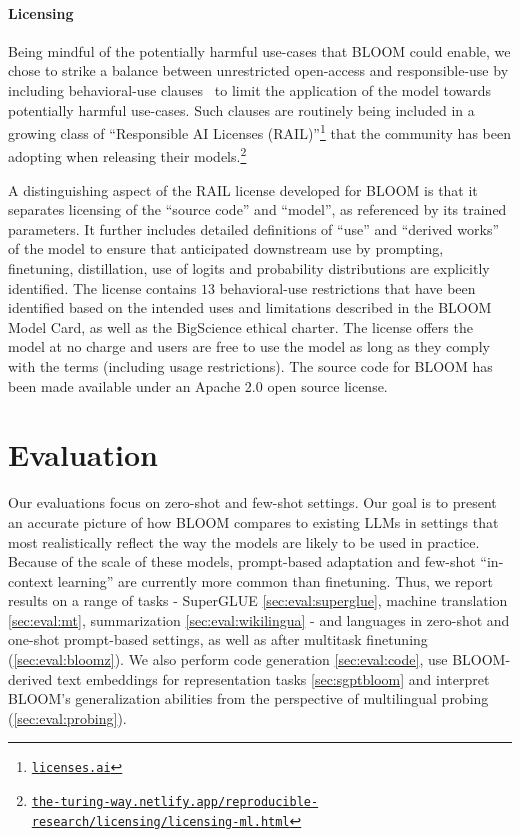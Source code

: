 \paragraph{Licensing}
Being mindful of the potentially harmful use-cases that BLOOM could enable, we chose to strike a balance between unrestricted open-access and responsible-use by including behavioral-use clauses~\citep{LicensingPaper} to limit the application of the model towards potentially harmful use-cases. Such clauses are routinely being included in a growing class of ``Responsible AI Licenses (RAIL)''\footnote{\href{http://licenses.ai}{\texttt{licenses.ai}}} that the community has been adopting when releasing their models.\footnote{\href{https://the-turing-way.netlify.app/reproducible-research/licensing/licensing-ml.html}{\texttt{the-turing-way.netlify.app/reproducible-research/licensing/licensing-ml.html}}} 

A distinguishing aspect of the RAIL license developed for BLOOM is that it separates licensing of the ``source code'' and ``model'', as referenced by its trained parameters. It further includes detailed definitions of ``use'' and ``derived works'' of the model to ensure that anticipated downstream use by prompting, finetuning, distillation, use of logits and probability distributions are explicitly identified. The license contains $13$ behavioral-use restrictions that have been identified based on the intended uses and limitations described in the BLOOM Model Card, as well as the BigScience ethical charter. The license offers the model at no charge and users are free to use the model as long as they comply with the terms (including usage restrictions). The source code for BLOOM has been made available under an Apache 2.0 open source license.

\section{Evaluation}
\label{sec:evaluation}

Our evaluations focus on zero-shot and few-shot settings. Our goal is to present an accurate picture of how BLOOM compares to existing LLMs in settings that most realistically reflect the way the models are likely to be used in practice. Because of the scale of these models, prompt-based adaptation and few-shot ``in-context learning'' are currently more common than finetuning. Thus, we report results on a range of tasks - SuperGLUE \ref{sec:eval:superglue}, machine translation \ref{sec:eval:mt}, summarization \ref{sec:eval:wikilingua} - and languages in zero-shot and one-shot prompt-based settings, as well as after multitask finetuning (\ref{sec:eval:bloomz}). We also perform code generation \ref{sec:eval:code}, use BLOOM-derived text embeddings for representation tasks \ref{sec:sgptbloom} and interpret BLOOM's generalization abilities from the perspective of multilingual probing (\ref{sec:eval:probing}).

